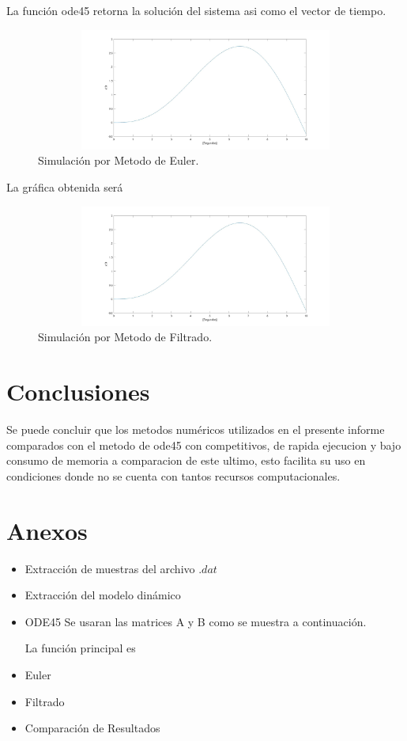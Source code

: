 \documentclass[12pt]{article}
\begin{document}
        La función ode45 retorna la solución del sistema asi como el vector de tiempo.

        \begin{figure}[h]
            \centering
            \includegraphics[width=15cm,height=4cm]{IMAGENES/10.jpg}
            \caption{Simulación por Metodo de Euler.}
        \end{figure}

        La gráfica obtenida será

        \begin{figure}[h]
            \centering
            \includegraphics[width=15cm,height=4cm]{IMAGENES/11.jpg}
            \caption{Simulación por Metodo de Filtrado.}
        \end{figure}
\section{Conclusiones}
Se puede concluir que los metodos numéricos utilizados en el presente informe comparados con el metodo de ode45 con competitivos, de rapida ejecucion y bajo consumo de memoria a comparacion de este ultimo, esto facilita su uso en condiciones donde no se cuenta con tantos recursos computacionales.
\section{Anexos}
\begin{itemize}
    \item Extracción de muestras del archivo $.dat$
    
    \item Extracción del modelo dinámico 
    
    \item ODE45
    Se usaran las matrices A y B como se muestra a continuación.
    
    La función principal es
    
    \item Euler
    
    \item Filtrado
    
    \item Comparación de Resultados
    
\end{itemize}


\end{document}
